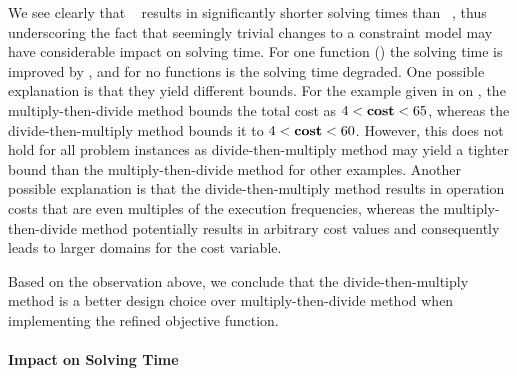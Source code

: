 We see clearly that ~
results in significantly shorter solving times than ~, thus underscoring the fact that seemingly
trivial changes to a \gls{constraint model} may have considerable impact on
solving time.
%
For one \gls{function} () the solving time is
improved by
\printZCNorm{%
  \NewOpCostFunVsOldPrePlusSolvingTimeSpeedupPrePlusSolvingTimeZeroCenteredSpeedupMax%
}, and for no \glspl{function} is the solving time degraded.
%
One possible explanation is that they yield different bounds.
%
For the example given in  on
, the \gls{multiply-then-divide method} bounds the
total cost as \mbox{$4 < \mVar{cost} < 65$}, whereas the
\gls{divide-then-multiply method} bounds it to \mbox{$4 < \mVar{cost} < 60$}.
%
However, this does not hold for all problem instances as
\gls{divide-then-multiply method} may yield a tighter bound than the
\gls{multiply-then-divide method} for other examples.
%
Another possible explanation is that the \gls{divide-then-multiply method}
results in \gls{operation} costs that are even multiples of the execution
frequencies, whereas the \gls{multiply-then-divide method} potentially results
in arbitrary cost values and consequently leads to larger \glspl{domain} for the
\gls{cost variable}.

Based on the observation above, we conclude that the \gls{divide-then-multiply
  method} is a better design choice over \gls{multiply-then-divide method} when
implementing the refined \gls{objective function}.


\paragraph{Impact on Solving Time}

